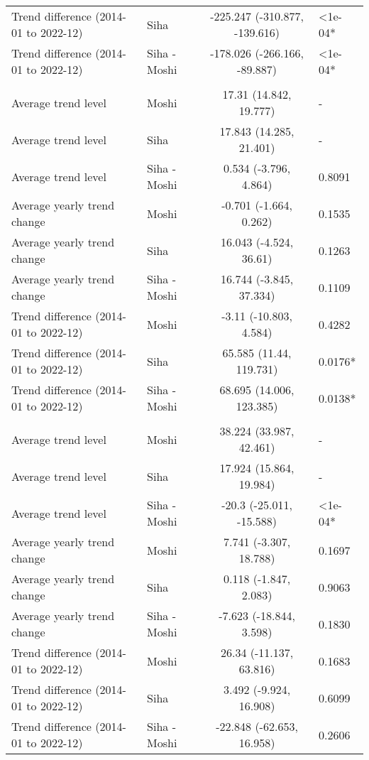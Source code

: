 \begin{longtable}{l|lcl}
Trend difference (2014-01 to 2022-12) & Siha & -225.247 (-310.877, -139.616) & <1e-04* \\ 
Trend difference (2014-01 to 2022-12) & Siha - Moshi & -178.026 (-266.166, -89.887) & <1e-04* \\ 
\midrule\addlinespace[2.5pt]
\multicolumn{4}{l}{Neoplasms/Cancer} \\ 
\midrule\addlinespace[2.5pt]
Average trend level & Moshi & 17.31 (14.842, 19.777) & - \\ 
Average trend level & Siha & 17.843 (14.285, 21.401) & - \\ 
Average trend level & Siha - Moshi & 0.534 (-3.796, 4.864) & 0.8091 \\ 
Average yearly trend change & Moshi & -0.701 (-1.664, 0.262) & 0.1535 \\ 
Average yearly trend change & Siha & 16.043 (-4.524, 36.61) & 0.1263 \\ 
Average yearly trend change & Siha - Moshi & 16.744 (-3.845, 37.334) & 0.1109 \\ 
Trend difference (2014-01 to 2022-12) & Moshi & -3.11 (-10.803, 4.584) & 0.4282 \\ 
Trend difference (2014-01 to 2022-12) & Siha & 65.585 (11.44, 119.731) & 0.0176* \\ 
Trend difference (2014-01 to 2022-12) & Siha - Moshi & 68.695 (14.006, 123.385) & 0.0138* \\ 
\midrule\addlinespace[2.5pt]
\multicolumn{4}{l}{Neuroses} \\ 
\midrule\addlinespace[2.5pt]
Average trend level & Moshi & 38.224 (33.987, 42.461) & - \\ 
Average trend level & Siha & 17.924 (15.864, 19.984) & - \\ 
Average trend level & Siha - Moshi & -20.3 (-25.011, -15.588) & <1e-04* \\ 
Average yearly trend change & Moshi & 7.741 (-3.307, 18.788) & 0.1697 \\ 
Average yearly trend change & Siha & 0.118 (-1.847, 2.083) & 0.9063 \\ 
Average yearly trend change & Siha - Moshi & -7.623 (-18.844, 3.598) & 0.1830 \\ 
Trend difference (2014-01 to 2022-12) & Moshi & 26.34 (-11.137, 63.816) & 0.1683 \\ 
Trend difference (2014-01 to 2022-12) & Siha & 3.492 (-9.924, 16.908) & 0.6099 \\ 
Trend difference (2014-01 to 2022-12) & Siha - Moshi & -22.848 (-62.653, 16.958) & 0.2606 \\ 

\end{longtable}
